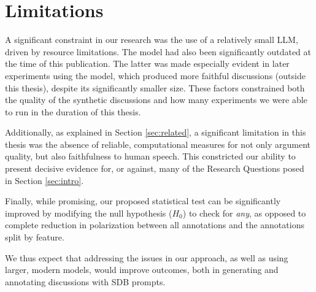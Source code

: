 %
\chapter{Limitations}
\label{sec:limitations}

A significant constraint in our research was the use of a relatively small LLM, driven by resource limitations. The model had also been significantly outdated at the time of this publication. The latter was made especially evident in later experiments using the  model, which produced more faithful discussions (outside this thesis), despite its significantly smaller size. These factors constrained both the quality of the synthetic discussions and how many experiments we were able to run in the duration of this thesis. 

Additionally, as explained in Section \ref{sec:related}, a significant limitation in this thesis was the absence of reliable, computational measures for not only argument quality, but also faithfulness to human speech. This constricted our ability to present decisive evidence for, or against, many of the Research Questions posed in Section \ref{sec:intro}.

Finally, while promising, our proposed statistical test can be significantly improved by modifying the null hypothesis ($H_0$) to check for \textit{any}, as opposed to complete reduction in polarization between all annotations and the annotations split by feature. 

We thus expect that addressing the issues in our approach, as well as using larger, modern models, would improve outcomes, both in generating and annotating discussions with \ac{SDB} prompts.